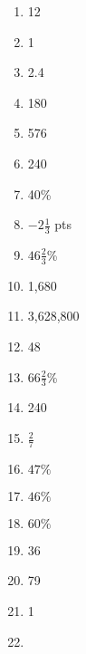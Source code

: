 \documentclass[../uilmath.tex]{subfiles}
\begin{document}
\begin{enumerate}[label=\bfseries\arabic*.]
    \item %
    12

    \item %
    1

    \item %
    2.4

    \item %
    180

    \item %
    576

    \item %
    240

    \item %
    40\%

    \item %
    $-2\frac{1}{3}$ pts 

    \item %
    $46\frac{2}{3}$\% 

    \item %
    1,680 

    \item %
    3,628,800

    \item %
    48 

    \item %
    $66\frac{2}{3}$\%

    \item %
    240

    \item %
    $\frac{2}{7}$

    \item %
    $47\%$

    \item %
    $46\%$

    \item %
    $60\%$

    \item %
    36 

    \item %
    79

    \item %
    1

    \item %
    
\end{enumerate}
\end{document}
